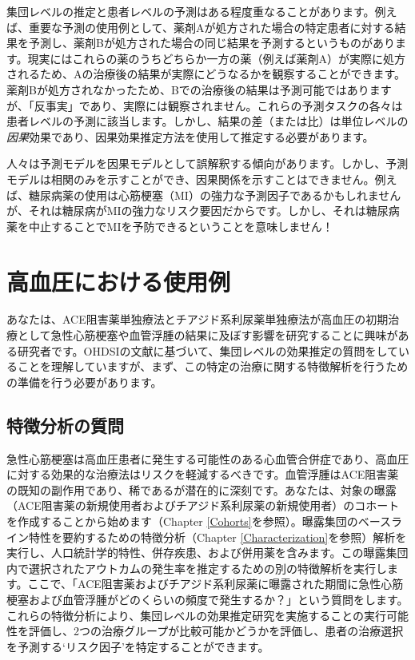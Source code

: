 \documentclass[
  11pt]{book}
\makeatletter
\newenvironment{kframe}{%
\medskip{}
\setlength{\fboxsep}{.8em}
 \def\at@end@of@kframe{}%
 \ifinner\ifhmode%
  \def\at@end@of@kframe{\end{minipage}}%
  \begin{minipage}{\columnwidth}%
 \fi\fi%
 \def\FrameCommand##1{\hskip\@totalleftmargin \hskip-\fboxsep
 \colorbox{myShadeColor}{##1}\hskip-\fboxsep
     \hskip-\linewidth \hskip-\@totalleftmargin \hskip\columnwidth}%
 \MakeFramed {\advance\hsize-\width
   \@totalleftmargin\z@ \linewidth\hsize
   \@setminipage}}%
 {\par\unskip\endMakeFramed%
 \at@end@of@kframe}
\newenvironment{rmdblock}[1]
  {
  \begin{itemize}
  \renewcommand{\labelitemi}{
    \raisebox{-.7\height}[0pt][0pt]{
      {\setkeys{Gin}{width=3em,keepaspectratio}\texttt{[image: images/\#1]}}
    }
  }
  \setlength{\fboxsep}{1em}
  \begin{kframe}
  \item
  }
  {
  \end{kframe}
  \end{itemize}
  }
\newenvironment{rmdimportant}
  {\begin{rmdblock}{important}}
  {\end{rmdblock}}
\theoremstyle{definition}
\theoremstyle{definition}
\theoremstyle{definition}
\theoremstyle{definition}
\theoremstyle{remark}
\makeatother
\begin{document}
集団レベルの推定と患者レベルの予測はある程度重なることがあります。例えば、重要な予測の使用例として、薬剤Aが処方された場合の特定患者に対する結果を予測し、薬剤Bが処方された場合の同じ結果を予測するというものがあります。現実にはこれらの薬のうちどちらか一方の薬（例えば薬剤A）が実際に処方されるため、Aの治療後の結果が実際にどうなるかを観察することができます。薬剤Bが処方されなかったため、Bでの治療後の結果は予測可能ではありますが、「反事実」であり、実際には観察されません。これらの予測タスクの各々は患者レベルの予測に該当します。しかし、結果の差（または比）は単位レベルの\emph{因果}効果であり、因果効果推定方法を使用して推定する必要があります。

\begin{rmdimportant}
人々は予測モデルを因果モデルとして誤解釈する傾向があります。しかし、予測モデルは相関のみを示すことができ、因果関係を示すことはできません。例えば、糖尿病薬の使用は心筋梗塞（MI）の強力な予測因子であるかもしれませんが、それは糖尿病がMIの強力なリスク要因だからです。しかし、それは糖尿病薬を中止することでMIを予防できるということを意味しません！
\end{rmdimportant}

\section{高血圧における使用例}\label{ux9ad8ux8840ux5727ux306bux304aux3051ux308bux4f7fux7528ux4f8b}

あなたは、ACE阻害薬単独療法とチアジド系利尿薬単独療法が高血圧の初期治療として急性心筋梗塞や血管浮腫の結果に及ぼす影響を研究することに興味がある研究者です。OHDSIの文献に基づいて、集団レベルの効果推定の質問をしていることを理解していますが、まず、この特定の治療に関する特徴解析を行うための準備を行う必要があります。

\subsection{特徴分析の質問}\label{ux7279ux5fb4ux5206ux6790ux306eux8ceaux554f}

急性心筋梗塞は高血圧患者に発生する可能性のある心血管合併症であり、高血圧に対する効果的な治療法はリスクを軽減するべきです。血管浮腫はACE阻害薬の既知の副作用であり、稀であるが潜在的に深刻です。あなたは、対象の曝露（ACE阻害薬の新規使用者およびチアジド系利尿薬の新規使用者）のコホートを作成することから始めます（Chapter \ref{Cohorts}を参照）。曝露集団のベースライン特性を要約するための特徴分析（Chapter \ref{Characterization}を参照）解析を実行し、人口統計学的特性、併存疾患、および併用薬を含みます。この曝露集団内で選択されたアウトカムの発生率を推定するための別の特徴解析を実行します。ここで、「ACE阻害薬およびチアジド系利尿薬に曝露された期間に急性心筋梗塞および血管浮腫がどのくらいの頻度で発生するか？」という質問をします。これらの特徴分析により、集団レベルの効果推定研究を実施することの実行可能性を評価し、2つの治療グループが比較可能かどうかを評価し、患者の治療選択を予測する`リスク因子'を特定することができます。
\end{document}
